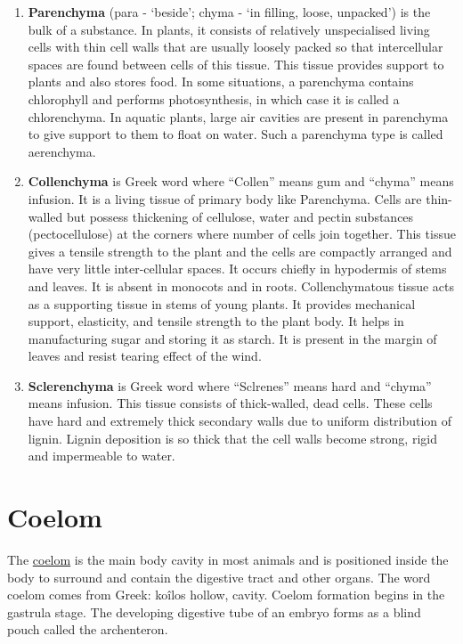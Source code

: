 \begin{enumerate}
\def\labelenumi{\arabic{enumi}.}
\tightlist
\item
  \textbf{Parenchyma} (para - `beside'; chyma - `in filling, loose,
  unpacked') is the bulk of a substance. In plants, it consists of
  relatively unspecialised living cells with thin cell walls that are
  usually loosely packed so that intercellular spaces are found between
  cells of this tissue. This tissue provides support to plants and also
  stores food. In some situations, a parenchyma contains chlorophyll and
  performs photosynthesis, in which case it is called a chlorenchyma. In
  aquatic plants, large air cavities are present in parenchyma to give
  support to them to float on water. Such a parenchyma type is called
  aerenchyma.
\item
  \textbf{Collenchyma} is Greek word where ``Collen'' means gum and
  ``chyma'' means infusion. It is a living tissue of primary body like
  Parenchyma. Cells are thin-walled but possess thickening of cellulose,
  water and pectin substances (pectocellulose) at the corners where
  number of cells join together. This tissue gives a tensile strength to
  the plant and the cells are compactly arranged and have very little
  inter-cellular spaces. It occurs chiefly in hypodermis of stems and
  leaves. It is absent in monocots and in roots. Collenchymatous tissue
  acts as a supporting tissue in stems of young plants. It provides
  mechanical support, elasticity, and tensile strength to the plant
  body. It helps in manufacturing sugar and storing it as starch. It is
  present in the margin of leaves and resist tearing effect of the wind.
\item
  \textbf{Sclerenchyma} is Greek word where ``Sclrenes'' means hard and
  ``chyma'' means infusion. This tissue consists of thick-walled, dead
  cells. These cells have hard and extremely thick secondary walls due
  to uniform distribution of lignin. Lignin deposition is so thick that
  the cell walls become strong, rigid and impermeable to water.
\end{enumerate}

\section{Coelom}\label{coelom}

The \href{https://en.wikipedia.org/wiki/Coelom}{coelom} is the main body
cavity in most animals and is positioned inside the body to surround and
contain the digestive tract and other organs. The word coelom comes from
Greek: koîlos hollow, cavity. Coelom formation begins in the gastrula
stage. The developing digestive tube of an embryo forms as a blind pouch
called the archenteron.

